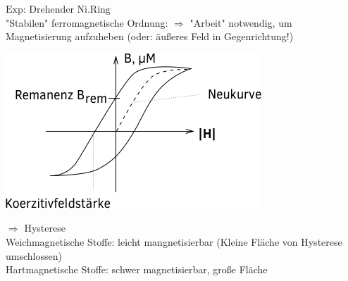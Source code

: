 $ \boxed{\text{Exp: Drehender Ni.Ring}} $ \\
"Stabilen" ferromagnetische Ordnung:
$ \Rightarrow $ "Arbeit" notwendig, um Magnetisierung aufzuheben (oder: äußeres Feld in Gegenrichtung!)
\begin{center}
	\includegraphics[width=0.5\linewidth]{skizzen/17/17B12}
\end{center}
$ \Rightarrow $ Hysterese \\
Weichmagnetische Stoffe: leicht mangnetisierbar (Kleine Fläche von Hysterese umschlossen)\\
Hartmagnetische Stoffe: schwer magnetisierbar, große Fläche\\
